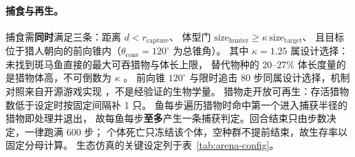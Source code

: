 \paragraph{捕食与再生。}捕食需\textbf{同时}满足三条：距离 $d<r_{\text{capture}}$、
体型门 $\text{size}_{\text{hunter}}\ge\kappa\,\text{size}_{\text{target}}$、
且目标位于猎人朝向的前向锥内（$\theta_{\text{cone}}=120^\circ$ 为总锥角）。
其中 $\kappa=1.25$ 属设计选择：未找到斑马鱼直接的最大可吞猎物与体长上限，
替代物种的 $20$--$27\%$ 体长度量的是猎物体高，不可倒数为 $\kappa$ \citep{bib221_mihalitsis2017}。
前向锥 $120^\circ$ 与限时追击 $80$ 步同属设计选择，机制对照来自开源游戏实现
\citep{bib217_tghbrkn.d.,bib218_monkwarriorn.d.}，不是经验证的生物学量。
猎物走开放可再生：存活猎物数低于设定时按固定间隔补 1 只。
鱼每步遍历猎物时命中第一个进入捕获半径的猎物即处理并退出，
故每鱼每步\textbf{至多}产生一条捕获判定。回合结束只由步数决定，一律跑满 600 步；
个体死亡只冻结该个体，空种群不提前结束，故生存率以固定分母计算。
生态仿真的关键设定列于表~\ref{tab:arena-config}。

\begin{table}[H]
  \centering
  \caption{生态仿真的关键设定。}
  \label{tab:arena-config}
  \footnotesize
\setlength{\tabcolsep}{1pt}
\end{table}

